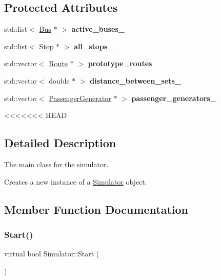 \begin{figure}[H]
\begin{center}
\subsection*{Protected Attributes}
\begin{DoxyCompactItemize}
\item 
\mbox{\label{classSimulator_a2936ff199db47fac93a4ca2970a8bf9a}} 
std\+::list$<$ \hyperlink{classBus}{Bus} $\ast$ $>$ {\bfseries active\+\_\+buses\+\_\+}
\item 
\mbox{\label{classSimulator_aa5539319a6b4a70c2d0c6f6220fe44c7}} 
std\+::list$<$ \hyperlink{classStop}{Stop} $\ast$ $>$ {\bfseries all\+\_\+stops\+\_\+}
\item 
\mbox{\label{classSimulator_a5be4c046d8654aa28b37308f581c3fc9}} 
std\+::vector$<$ \hyperlink{classRoute}{Route} $\ast$ $>$ {\bfseries prototype\+\_\+routes}
\item 
\mbox{\label{classSimulator_aa14b28ce4f5c0fa6f9e96f9e3b9aae73}} 
std\+::vector$<$ double $\ast$ $>$ {\bfseries distance\+\_\+between\+\_\+sets\+\_\+}
\item 
\mbox{\label{classSimulator_a666884fa56160538fb7ceac476aedd44}} 
std\+::vector$<$ \hyperlink{classPassengerGenerator}{Passenger\+Generator} $\ast$ $>$ {\bfseries passenger\+\_\+generators\+\_\+}
\end{DoxyCompactItemize}


<<<<<<< HEAD
\subsection{Detailed Description}
The main class for the simulator. 

Creates a new instance of a \hyperlink{classSimulator}{Simulator} object. 

\subsection{Member Function Documentation}
\mbox{\label{classSimulator_a0db68bef442ba6061a5f38189bbe3512}} 
\subsubsection{\texorpdfstring{Start()}{Start()}}
{\footnotesize\ttfamily virtual bool Simulator\+::\+Start (\begin{DoxyParamCaption}{ }\end{DoxyParamCaption})\hspace{0.3cm}{\ttfamily [pure virtual]}}




\end{center}
\end{figure}
